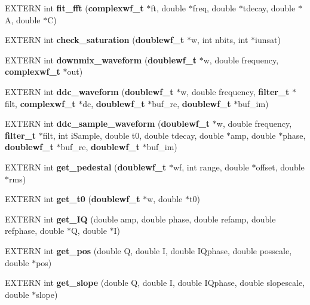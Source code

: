 \begin{CompactItemize}
\item 
EXTERN int {\bf fit\_\-fft} ({\bf complexwf\_\-t} $\ast$ft, double $\ast$freq, double $\ast$tdecay, double $\ast$A, double $\ast$C)
\item 
EXTERN int {\bf check\_\-saturation} ({\bf doublewf\_\-t} $\ast$w, int nbits, int $\ast$iunsat)
\item 
EXTERN int {\bf downmix\_\-waveform} ({\bf doublewf\_\-t} $\ast$w, double frequency, {\bf complexwf\_\-t} $\ast$out)
\item 
EXTERN int {\bf ddc\_\-waveform} ({\bf doublewf\_\-t} $\ast$w, double frequency, {\bf filter\_\-t} $\ast$filt, {\bf complexwf\_\-t} $\ast$dc, {\bf doublewf\_\-t} $\ast$buf\_\-re, {\bf doublewf\_\-t} $\ast$buf\_\-im)
\item 
EXTERN int {\bf ddc\_\-sample\_\-waveform} ({\bf doublewf\_\-t} $\ast$w, double frequency, {\bf filter\_\-t} $\ast$filt, int iSample, double t0, double tdecay, double $\ast$amp, double $\ast$phase, {\bf doublewf\_\-t} $\ast$buf\_\-re, {\bf doublewf\_\-t} $\ast$buf\_\-im)
\item 
EXTERN int {\bf get\_\-pedestal} ({\bf doublewf\_\-t} $\ast$wf, int range, double $\ast$offset, double $\ast$rms)
\item 
EXTERN int {\bf get\_\-t0} ({\bf doublewf\_\-t} $\ast$w, double $\ast$t0)
\item 
EXTERN int {\bf get\_\-IQ} (double amp, double phase, double refamp, double refphase, double $\ast$Q, double $\ast$I)
\item 
EXTERN int {\bf get\_\-pos} (double Q, double I, double IQphase, double posscale, double $\ast$pos)
\item 
EXTERN int {\bf get\_\-slope} (double Q, double I, double IQphase, double slopescale, double $\ast$slope)
\end{CompactItemize}
